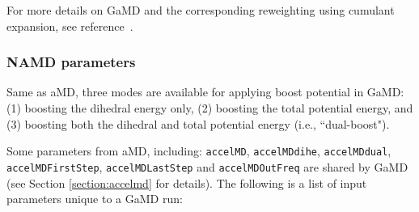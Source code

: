For more details on GaMD and the corresponding reweighting using cumulant expansion, see reference~\cite{MIAO2015mc}\cite{PANG2017mc}. 

\subsubsection{NAMD parameters}

Same as aMD, three modes are available for applying boost potential in GaMD: 
(1) boosting the dihedral energy only, 
(2) boosting the total potential energy, and 
(3) boosting both the dihedral and total potential energy (i.e., ``dual-boost").

Some parameters from aMD, including: {\tt accelMD}, {\tt accelMDdihe}, {\tt accelMDdual}, {\tt accelMDFirstStep}, {\tt accelMDLastStep} and {\tt accelMDOutFreq} are shared by GaMD (see Section \ref{section:accelmd} for details).
The following is a list of input parameters unique to a GaMD run:

